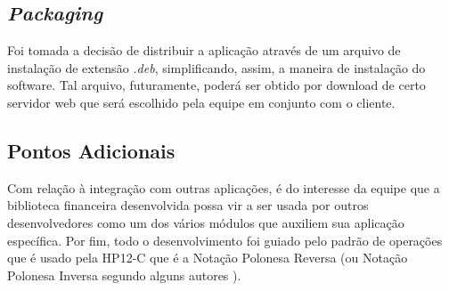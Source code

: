 \subsection{\textit{Packaging}}
Foi tomada a decisão de distribuir a aplicação através de um arquivo de instalação de extensão \textit{.deb}, simplificando, assim, a maneira de instalação do software. Tal arquivo, futuramente, poderá ser obtido por download de certo servidor web que será escolhido pela equipe em conjunto com o cliente.

\subsection{Pontos Adicionais}
Com relação à integração com outras aplicações, é do interesse da equipe que a biblioteca financeira desenvolvida possa vir a ser usada por outros desenvolvedores como um dos vários módulos que auxiliem sua aplicação específica.
Por fim, todo o desenvolvimento foi guiado pelo padrão de operações que é usado pela HP12-C que é a Notação Polonesa Reversa (ou Notação Polonesa Inversa segundo alguns autores \cite{NPR}).